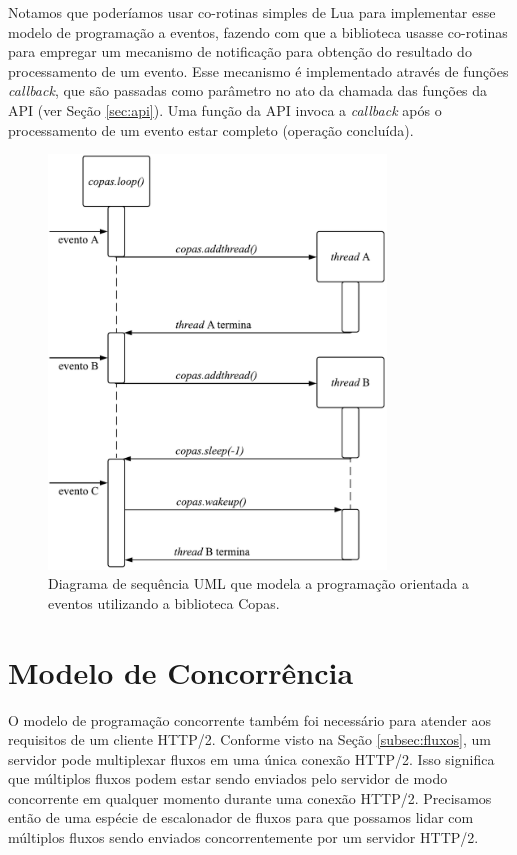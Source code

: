Notamos que poderíamos usar co-rotinas simples de Lua para implementar esse modelo de programação a eventos, fazendo com que a biblioteca usasse co-rotinas para empregar um mecanismo de notificação para obtenção do resultado do processamento de um evento. Esse mecanismo é implementado através de funções {\em callback}, que são passadas como parâmetro no ato da chamada das funções da API (ver Seção \ref{sec:api}). Uma função da API invoca a {\em callback} após o processamento de um evento estar completo (operação concluída).

\begin{figure}[hbt!]
 \centering
  \includegraphics[width=0.8\textwidth]{./fig/events}
 \caption{Diagrama de sequência UML que modela a programação orientada a eventos utilizando a biblioteca Copas.}
 \label{fig:events}
\end{figure}

\section{Modelo de Concorrência}

O modelo de programação concorrente também foi necessário para atender aos requisitos de um cliente HTTP/2. Conforme visto na Seção \ref{subsec:fluxos}, um servidor pode multiplexar fluxos em uma única conexão HTTP/2. Isso significa que múltiplos fluxos podem estar sendo enviados pelo servidor de modo concorrente em qualquer momento durante uma conexão HTTP/2. Precisamos então de uma espécie de escalonador de fluxos para que possamos lidar com múltiplos fluxos sendo enviados concorrentemente por um servidor HTTP/2. 

